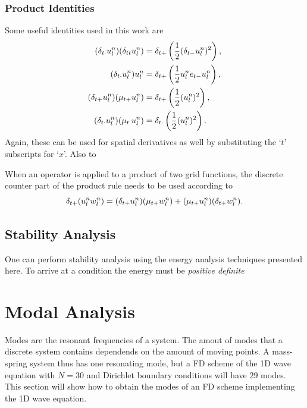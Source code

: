\subsubsection{Product Identities}
Some useful identities used in this work are
\begin{subequations}
    \begin{align}
        (\delta_{t\cdot} u_l^n)(\delta_{tt} u_l^n) &= \delta_{t+} \left(\frac{1}{2}(\delta_{t-} u_l^n)^2\right),\label{eq:prodIdentity1}\\
        (\delta_{t\cdot} u_l^n)u_l^n &= \delta_{t+} \left(\frac{1}{2}u_l^n e_{t-}u_l^n\right),\label{eq:prodIdentity2}\\
        (\delta_{t+} u_l^n)(\mu_{t+} u_l^n) &= \delta_{t+} \left(\frac{1}{2}(u_l^n)^2\right),\label{eq:prodIdentity3}\\
        (\delta_{t\cdot} u_l^n)(\mu_{t\cdot}u_l^n) &= \delta_{t\cdot}\left(\frac{1}{2} (u_l^n)^2\right).\label{eq:prodIdentity4}
    \end{align}
\end{subequations}
Again, these can be used for spatial derivatives as well by substituting the `$t$' subscripts for `$x$'. Also  to 

When an operator is applied to a product of two grid functions, the discrete counter part of the product rule needs to be used according to
\begin{equation}
    \delta_{t+} (u_l^nw_l^n) = (\delta_{t+} u_l^n)(\mu_{t+}w_l^n) + (\mu_{t+} u_l^n)(\delta_{t+} w_l^n).
\end{equation}


\subsection{Stability Analysis}
One can perform stability analysis using the energy analysis techniques presented here. To arrive at a condition the energy must be \textit{positive definite} 

\section{Modal Analysis}
\label{sec:modalAnalysis}
Modes are the resonant frequencies of a system. The amout of modes that a discrete system contains dependends on the amount of moving points. A mass-spring system thus has one resonating mode, but a FD scheme of the 1D wave equation with $N = 30$ and Dirichlet boundary conditions will have $29$ modes. This section will show how to obtain the modes of an FD scheme implementing the 1D wave equation. 

